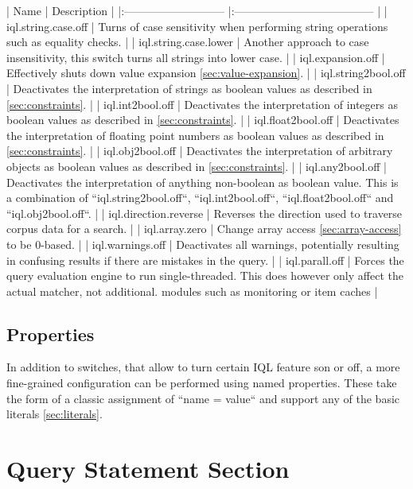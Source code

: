 \documentclass[11pt]{article}
\begin{document}
|    Name                     |   Description                          |
|:--------------------------- |:-------------------------------------- |
| iql.string.case.off         | Turns of case sensitivity when performing string operations such as equality checks. |
| iql.string.case.lower       | Another approach to case insensitivity, this switch turns all strings into lower case. |
| iql.expansion.off           | Effectively shuts down value expansion \cref{sec:value-expansion}. |
| iql.string2bool.off         | Deactivates the interpretation of strings as boolean values as described in \cref{sec:constraints}. |
| iql.int2bool.off            | Deactivates the interpretation of integers as boolean values as described in \cref{sec:constraints}. |
| iql.float2bool.off          | Deactivates the interpretation of floating point numbers as boolean values as described in \cref{sec:constraints}. |
| iql.obj2bool.off            | Deactivates the interpretation of arbitrary objects as boolean values as described in \cref{sec:constraints}. |
| iql.any2bool.off            | Deactivates the interpretation of anything non-boolean as boolean value. This is a combination of ``iql.string2bool.off``, ``iql.int2bool.off``, ``iql.float2bool.off`` and  ``iql.obj2bool.off``. |
| iql.direction.reverse       | Reverses the direction used to traverse corpus data for a search. |
| iql.array.zero              | Change array access \cref{sec:array-access} to be 0-based. |
| iql.warnings.off            | Deactivates all warnings, potentially resulting in confusing results if there are mistakes in the query. |
| iql.parall.off			  | Forces the query evaluation engine to run single-threaded. This does however only affect the actual matcher, not additional. modules such as monitoring or item caches |

\subsection{Properties}
\label{sec:properties}

In addition to switches, that allow to turn certain IQL feature son or off, a more fine-grained configuration can be performed using named properties. These take the form of a classic assignment of ``name = value`` and support any of the basic literals \cref{sec:literals}.

\section{Query Statement Section}
\label{sec:query-statement}
\end{document}

